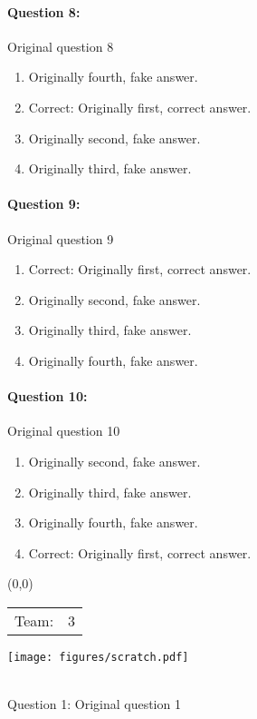 \documentclass[9pt, twoside, twocolumn]{extarticle}
\renewcommand{\includegraphics}[2][]{\OldIncludegraphics[width=\linewidth, #1]{#2}}
\newcommand{\teamprefix}[2]{%
\begin{textblock}{3.5}(0,0)
\begin{tabular}{ll}
Team: & \huge\linespread{6} #1
\end{tabular}

\texttt{[image: figures/scratch.pdf]}

\end{textblock}
\textcolor{white}{.}\\ %
\vspace{10cm}
}%
\begin{document}
\paragraph{Question 8:}
Original question 8

\begin{enumerate}[label=\textbf{{\Alph*}},labelindent=0pt, labelsep=1.5em, parsep=0.2em]
\item Originally fourth, fake answer.
\item Correct: Originally first, correct answer.
\item Originally second, fake answer.
\item Originally third, fake answer.
\end{enumerate}
\paragraph{Question 9:}
Original question 9

\begin{enumerate}[label=\textbf{{\Alph*}},labelindent=0pt, labelsep=1.5em, parsep=0.2em]
\item Correct: Originally first, correct answer.
\item Originally second, fake answer.
\item Originally third, fake answer.
\item Originally fourth, fake answer.
\end{enumerate}
\paragraph{Question 10:}
Original question 10

\begin{enumerate}[label=\textbf{{\Alph*}},labelindent=0pt, labelsep=1.5em, parsep=0.2em]
\item Originally second, fake answer.
\item Originally third, fake answer.
\item Originally fourth, fake answer.
\item Correct: Originally first, correct answer.
\end{enumerate}
\cleardoublepage
\newpage

\teamprefix{3}

\paragraph{Question 1:}
Original question 1
\end{document}

